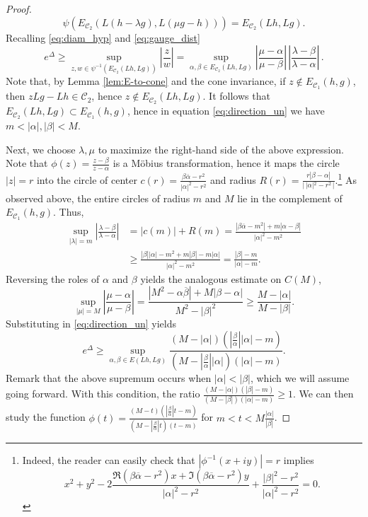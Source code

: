 \documentclass{amsart}
\numberwithin{equation}{section}
\newcommand\cC{{\mathcal C}}
\begin{document}
\begin{proof}
\[
\psi(E_{\cC_2}(L(h -\lambda g), L(\mu g-h)))=E_{\cC_2}(Lh,Lg).
\]
Recalling \eqref{eq:diam_hyp} and \eqref{eq:gauge_dist}
\begin{equation}\label{eq:direction_un}
e^\Delta\geq \sup_{z,w\in\psi^{-1}(E_{\cC_2}(Lh,Lg))}\left|\frac z w\right|=\sup_{\alpha,\beta\in E_{\cC_2}(Lh,Lg)}\left|\frac  {\mu-\alpha}{\mu-\beta}\right|\,\left| \frac {\lambda-\beta}{\lambda-\alpha }\right| \, .
\end{equation}
Note that, by Lemma  \ref{lem:E-to-cone} and the cone invariance, if $z\not\in E_{\cC_1}(h,g)$, then $zLg-Lh\in\cC_2$, hence $z\not\in  E_{\cC_2}(Lh,Lg)$. It follows that $E_{\cC_2}(Lh,Lg)\subset E_{\cC_1}(h,g)$, 
hence in equation \eqref{eq:direction_un} we have $m <  |\alpha|,|\beta| < M$.

Next, we choose $\lambda,\mu$ to maximize the right-hand side of the above expression. Note that $\phi(z)=\frac {z-\beta}{z-\alpha }$ is a M\"obius transformation, hence it maps the circle $|z|=r$ into the circle of center
$c(r)=\frac{\beta\overline\alpha-r^2}{|\alpha|^2-r^2}$ and radius $R(r)=\frac{ r|\beta-\alpha|}{|\,|\alpha|^2-r^2\,|}$.\footnote{ Indeed, the reader can easily check that $|\phi^{-1}(x+iy)|=r$ implies 
\[
x^2+y^2-2\frac{\Re(\beta\overline\alpha-r^2)x+\Im(\beta\overline\alpha-r^2)y}{|\alpha|^2-r^2}+\frac{|\beta|^2-r^2}{|\alpha|^2-r^2}=0 .
\]
}
As observed above, the entire circles of radius $m$ and $M$ lie in the
complement of $E_{\cC_1}(h,g)$.
Thus,
\[
\begin{split}
\sup_{|\lambda|=m}\left|\frac  {\lambda-\beta}{\lambda-\alpha}\right|&
=|c(m)|+R(m)=\frac{|\beta \overline\alpha-m^2|+m|\alpha-\beta|}{|\alpha|^2-m^2} \\
& \geq \frac{|\beta||\alpha| - m^2 + m|\beta| - m|\alpha|}{|\alpha|^2 - m^2} 
= \frac{|\beta|-m}{|\alpha|-m}.
\end{split}
\]
Reversing the roles of $\alpha$ and $\beta$ yields the analogous estimate on $C(M)$,
\[
\sup_{|\mu|=M}\left|\frac  {\mu-\alpha}{\mu-\beta}\right| = \frac{|M^2- \alpha \overline\beta|+M|\beta-\alpha|}{M^2-|\beta|^2} \geq \frac{M-|\alpha|}{M-|\beta|} .
\]
Substituting in \eqref{eq:direction_un} yields
\[
e^\Delta\geq \sup_{\alpha,\beta\in E(Lh,Lg)}\frac{(M-|\alpha|)(|\frac{\beta}\alpha||\alpha|-m)}{(M-|\frac{\beta}\alpha||\alpha|)(|\alpha|-m)}.
\]
Remark that the above supremum occurs when $|\alpha| < |\beta|$, which we will assume going forward.  With this condition, the ratio 
$\frac{ (M- |\alpha|)(|\beta| - m)}{(M - |\beta|)(|\alpha| - m)} \ge 1$.
We can then study the function $\phi(t)=\frac{(M-t)(|\frac{\beta}\alpha| t-m)}{(M-|\frac{\beta}\alpha|t)(t-m)}$  for $m<t<M \frac{|\alpha|}{|\beta|}$.

\end{proof}
\end{document}

